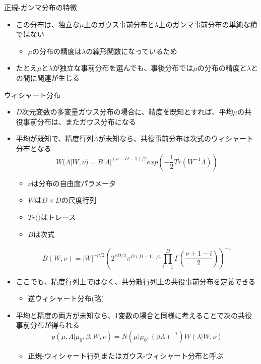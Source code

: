 \begin{frame}{正規-ガンマ分布の特徴}
 \begin{itemize}
  \item この分布は、独立な$\mu$上のガウス事前分布と$\lambda$上のガンマ事前分布の単純な積ではない
        \begin{itemize}
         \item $\mu$の分布の精度は$\lambda$の線形関数になっているため
        \end{itemize}
  \item たとえ$\mu$と$\lambda$が独立な事前分布を選んでも、事後分布では$\mu$の分布の精度と$\lambda$との間に関連が生じる
 \end{itemize}
\end{frame}

\begin{frame}{ウィシャート分布}
 \begin{itemize}
  \item $D$次元変数の多変量ガウス分布の場合に、精度を既知とすれば、平均$\mu$の共役事前分布は、またガウス分布になる
  \item 平均が既知で、精度行列$\Lambda$が未知なら、共役事前分布は次式のウィシャート分布となる
        \begin{equation}
         W(\Lambda|W,\nu) = B|\Lambda|^{(\nu-D-1)/2}exp(-\frac{1}{2}Tr(W^{-1}\Lambda))
        \end{equation}
        \begin{itemize}
         \item $\nu$は分布の自由度パラメータ
         \item $W$は$D \times D$の尺度行列
         \item $Tr(\dot)$はトレース
         \item $B$は次式
        \end{itemize}
        \begin{equation}
         B(W,\nu) = |W|^{-\nu/2}(2^{\nu D/2}\pi^{D(D-1)/4}\prod_{i=1}^D\Gamma(\frac{\nu+1-i}{2}))^{-1}
        \end{equation}
  \item ここでも、精度行列上ではなく、共分散行列上の共役事前分布を定義できる
        \begin{itemize}
         \item 逆ウィシャート分布(略)
        \end{itemize}
  \item 平均と精度の両方が未知なら、1変数の場合と同様に考えることで次の共役事前分布が得られる
        \begin{equation}
         p(\mu,\Lambda|\mu_0,\beta,W,\nu) = N(\mu|\mu_0,(\beta\Lambda)^{-1})W(\lambda|W,\nu)
        \end{equation}
        \begin{itemize}
         \item 正規-ウィシャート行列またはガウス-ウィシャート分布と呼ぶ
        \end{itemize}
 \end{itemize}
\end{frame}
